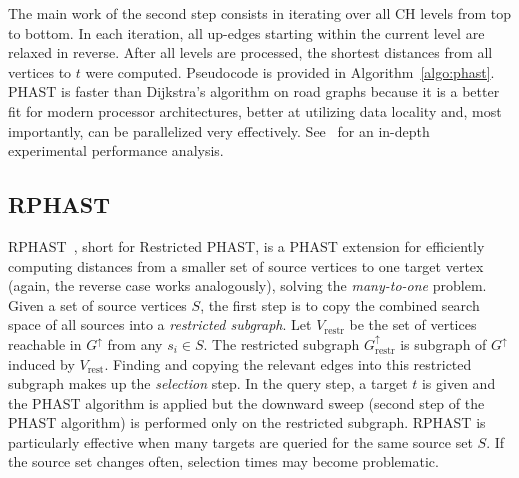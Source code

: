 \documentclass[manuscript,review]{acmart}
\newcommand*{\gchu}{G^{\uparrow}}
\begin{document}
The main work of the second step consists in iterating over all CH levels from top to bottom.
In each iteration, all up-edges starting within the current level are relaxed in reverse.
After all levels are processed, the shortest distances from all vertices to $t$ were computed.
Pseudocode is provided in Algorithm~\ref{algo:phast}.
PHAST is faster than Dijkstra's algorithm on road graphs because it is a better fit for modern processor architectures, better at utilizing data locality and, most importantly, can be parallelized very effectively.
See~\cite{dgnw-phast-13} for an in-depth experimental performance analysis.


\subsection{RPHAST}

RPHAST~\cite{delling_et_al:OASIcs:2011:3266}, short for Restricted PHAST, is a PHAST extension for efficiently computing distances from a smaller set of source vertices to one target vertex (again, the reverse case works analogously), solving the \emph{many-to-one} problem.
Given a set of source vertices $S$, the first step is to copy the combined search space of all sources into a \emph{restricted subgraph}.
Let $V_{\operatorname{restr}}$ be the set of vertices reachable in $\gchu$ from any $s_i \in S$.
The restricted subgraph $\gchu_{\operatorname{restr}}$ is subgraph of $\gchu$ induced by $V_{\operatorname{rest}}$.
Finding and copying the relevant edges into this restricted subgraph makes up the \emph{selection} step.
In the query step, a target $t$ is given and the PHAST algorithm is applied but the downward sweep (second step of the PHAST algorithm) is performed only on the restricted subgraph.
RPHAST is particularly effective when many targets are queried for the same source set $S$.
If the source set changes often, selection times may become problematic.
\end{document}
